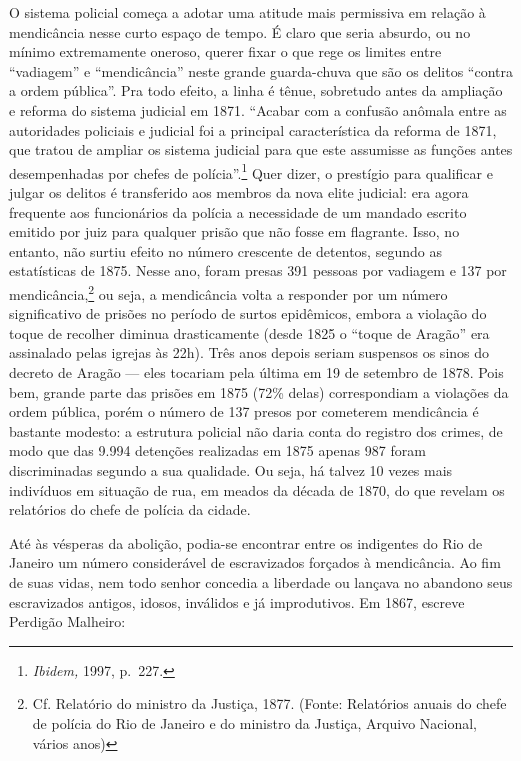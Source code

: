 O sistema policial começa a adotar uma atitude mais permissiva em
relação à mendicância nesse curto espaço de tempo. É claro que seria
absurdo, ou no mínimo extremamente oneroso, querer fixar o que rege os
limites entre ``vadiagem'' e ``mendicância'' neste grande guarda-chuva
que são os delitos ``contra a ordem pública''. Pra todo efeito, a linha
é tênue, sobretudo antes da ampliação e reforma do sistema judicial em
1871. ``Acabar com a confusão anômala entre as autoridades policiais e
judicial foi a principal característica da reforma de 1871, que tratou
de ampliar os sistema judicial para que este assumisse as funções antes
desempenhadas por chefes de polícia''.\footnote{\textit{Ibidem,} 1997,
  p.~227.} Quer dizer, o prestígio para qualificar e julgar os delitos é
transferido aos membros da nova elite judicial: era agora frequente aos
funcionários da polícia a necessidade de um mandado escrito emitido por
juiz para qualquer prisão que não fosse em flagrante. Isso, no entanto,
não surtiu efeito no número crescente de detentos, segundo as
estatísticas de 1875. Nesse ano, foram presas 391 pessoas por vadiagem e
137 por mendicância,\footnote{Cf. Relatório do ministro da Justiça,
  1877. (Fonte: Relatórios anuais do chefe de polícia do Rio de Janeiro
  e do ministro da Justiça, Arquivo Nacional, vários anos)} ou seja, a
mendicância volta a responder por um número significativo de prisões no
período de surtos epidêmicos, embora a violação do toque de recolher
diminua drasticamente (desde 1825 o ``toque de Aragão'' era assinalado
pelas igrejas às 22h). Três anos depois seriam suspensos os sinos do
decreto de Aragão --- eles tocariam pela última em 19 de setembro de
1878. Pois bem, grande parte das prisões em 1875 (72\% delas)
correspondiam a violações da ordem pública, porém o número de 137 presos
por cometerem mendicância é bastante modesto: a estrutura policial não
daria conta do registro dos crimes, de modo que das 9.994 detenções
realizadas em 1875 apenas 987 foram discriminadas segundo a sua
qualidade. Ou seja, há talvez 10 vezes mais indivíduos em situação de
rua, em meados da década de 1870, do que revelam os relatórios do chefe
de polícia da cidade.

Até às vésperas da abolição, podia-se encontrar entre os indigentes do
Rio de Janeiro um número considerável de escravizados forçados à
mendicância. Ao fim de suas vidas, nem todo senhor concedia a liberdade
ou lançava no abandono seus escravizados antigos, idosos, inválidos e já
improdutivos. Em 1867, escreve Perdigão Malheiro:

